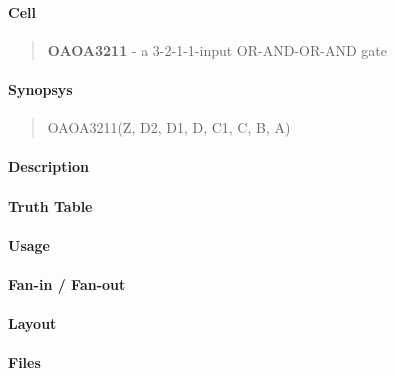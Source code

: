 \label{OAOA3211}
\paragraph{Cell}
\begin{quote}
    \textbf{OAOA3211} - a 3-2-1-1-input OR-AND-OR-AND gate
\end{quote}

\paragraph{Synopsys}
\begin{quote}
    OAOA3211(Z, D2, D1, D, C1, C, B, A)
\end{quote}

\paragraph{Description}

%

\paragraph{Truth Table}
%

\paragraph{Usage}

\paragraph{Fan-in / Fan-out}

\paragraph{Layout}

\paragraph{Files}
